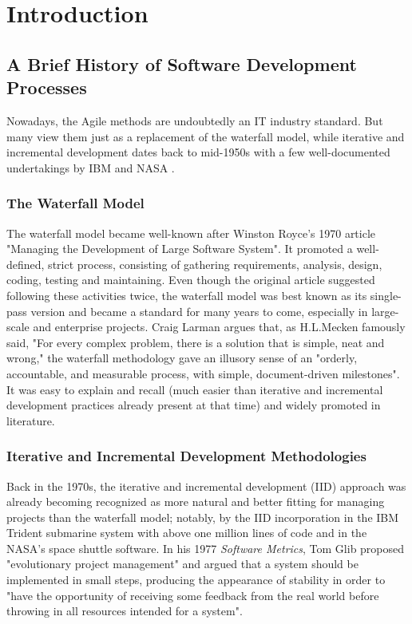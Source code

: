 \documentclass{article}
\begin{document}
\section{Introduction}
\subsection{A Brief History of Software Development Processes}
Nowadays, the Agile methods are undoubtedly an IT industry standard. But many view them just as a replacement of the waterfall model, while iterative and incremental development dates back to mid-1950s with a few well-documented undertakings by IBM and NASA \citep{larman2003iterative}.

\subsubsection{The Waterfall Model}
The waterfall model became well-known after Winston Royce's 1970 article "Managing the Development of Large Software System". It promoted a well-defined, strict process, consisting of gathering requirements, analysis, design, coding, testing and maintaining. Even though the original article suggested following these activities twice, the waterfall model was best known as its single-pass version and became a standard for many years to come, especially in large-scale and enterprise projects. Craig Larman \citep{larman2003iterative} argues that, as H.L.Mecken famously said, "For every complex problem, there is a solution that is simple, neat and wrong," the waterfall methodology gave an illusory sense of an "orderly, accountable, and measurable process, with simple, document-driven milestones". It was easy to explain and recall (much easier than iterative and incremental development practices already present at that time) and widely promoted in literature.

\subsubsection{Iterative and Incremental Development Methodologies}
Back in the 1970s, the iterative and incremental development (IID) approach was already becoming recognized as more natural and better fitting for managing projects than the waterfall model; notably, by the IID incorporation in the IBM Trident submarine system with above one million lines of code and in the NASA's space shuttle software. In his 1977 \textit{Software Metrics}, Tom Glib proposed "evolutionary project management" and argued that a system should be implemented in small steps, producing the appearance of stability in order to "have the opportunity of receiving some feedback from the real world before throwing in all resources intended for a system".\citep{glib1977,p.214}
\end{document}
